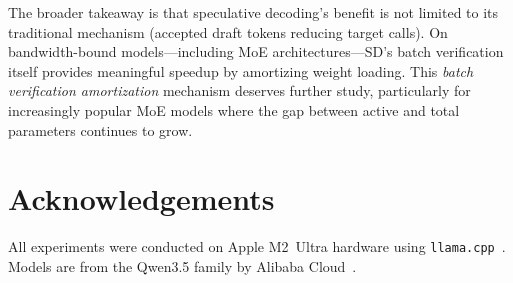 \documentclass[11pt,a4paper]{article}
\begin{document}
The broader takeaway is that speculative decoding's benefit is not limited to its traditional mechanism (accepted draft tokens reducing target calls). On bandwidth-bound models---including MoE architectures---SD's batch verification itself provides meaningful speedup by amortizing weight loading. This \emph{batch verification amortization} mechanism deserves further study, particularly for increasingly popular MoE models where the gap between active and total parameters continues to grow.

\section*{Acknowledgements}

All experiments were conducted on Apple M2~Ultra hardware using \texttt{llama.cpp}~\cite{llamacpp}. Models are from the Qwen3.5 family by Alibaba Cloud~\cite{qwen2024}.
\end{document}
